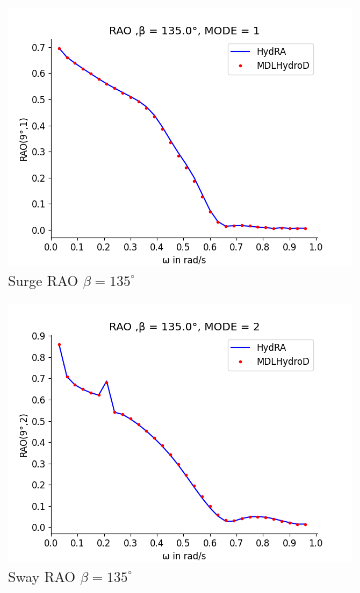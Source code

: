 \begin{figure}[H]
    \centering
    \begin{subfigure}[b]{0.49\textwidth}
        \includegraphics[width=\textwidth]{plots/kcs/rao2/rao1.png}
        \caption{Surge RAO $\beta = 135^{\circ}$}
    \end{subfigure}
    \begin{subfigure}[b]{0.49\textwidth}
        \includegraphics[width=\textwidth]{plots/kcs/rao2/rao2.png}
        \caption{Sway RAO $\beta = 135^{\circ}$}
    \end{subfigure}
    \vspace{5pt}%
    \begin{subfigure}[b]{0.49\textwidth}

\end{subfigure}
\end{figure}
